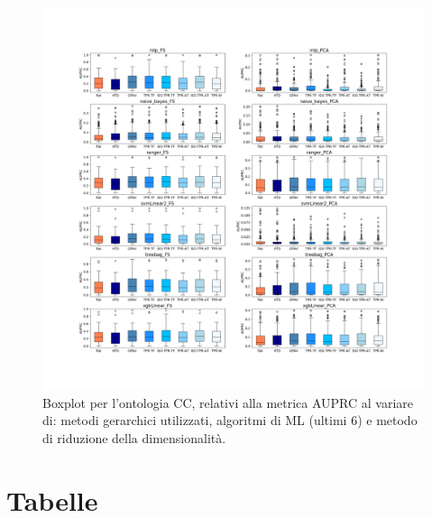 \documentclass[12pt]{report}
\begin{document}
\begin{appendices}
\begin{figure}[h]
 \hspace*{-2.6cm}
\includegraphics[scale=0.34]{./images/CC_PRC_2.png}
\caption{\footnotesize{Boxplot per l'ontologia CC, relativi alla metrica AUPRC al variare di: metodi gerarchici utilizzati, algoritmi di ML (ultimi 6) e metodo di riduzione della dimensionalità.}}
\label{CC_PRC_2}
\end{figure}

\chapter{Tabelle}


\end{appendices}
\end{document}
